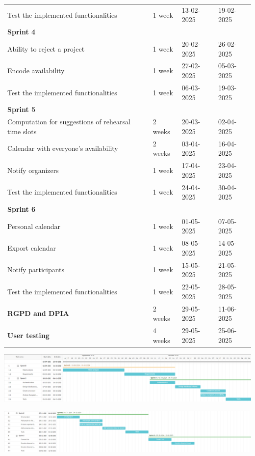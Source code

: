 \documentclass[11pt]{article}
\begin{document}
\begin{table}[htbp]
\begin{tabular}{| p{9cm} | p{2cm} | p{2.1cm} | p{2cm} |}
    \quad Test the implemented functionalities & 1 week & 13-02-2025 & 19-02-2025 \\
    \textbf{Sprint 4} &&&\\
    \quad Ability to reject a project & 1 week & 20-02-2025 & 26-02-2025 \\
    \quad Encode availability & 1 week & 27-02-2025 & 05-03-2025\\
    \quad Test the implemented functionalities & 1 week & 06-03-2025 & 19-03-2025 \\
    \textbf{Sprint 5} &&&\\
    \quad Computation for suggestions of rehearsal time slots & 2 weeks & 20-03-2025 & 02-04-2025 \\
    \quad Calendar with everyone's availability & 2 weeks & 03-04-2025 & 16-04-2025 \\
    \quad Notify organizers & 1 week & 17-04-2025 & 23-04-2025 \\
    \quad Test the implemented functionalities & 1 week & 24-04-2025 & 30-04-2025\\
    \textbf{Sprint 6} &&&\\
    \quad Personal calendar & 1 week & 01-05-2025 & 07-05-2025 \\
    \quad Export calendar & 1 week & 08-05-2025 & 14-05-2025 \\
    \quad Notify participants & 1 week & 15-05-2025 & 21-05-2025 \\
    \quad Test the implemented functionalities & 1 week & 22-05-2025 & 28-05-2025\\
    \textbf{RGPD and DPIA} & 2 weeks & 29-05-2025 & 11-06-2025 \\
    \textbf{User testing} & 4 weeks & 29-05-2025 & 25-06-2025\\
    \hline
    \end{tabular}
\end{table}

\newpage

\vspace{1cm}
\hspace{-1.5cm}
\includegraphics[scale=0.6]{g1.png}

\vspace{1cm}
\hspace{-1.5cm}
\includegraphics[scale=0.57]{g2.png} 
\end{document}
